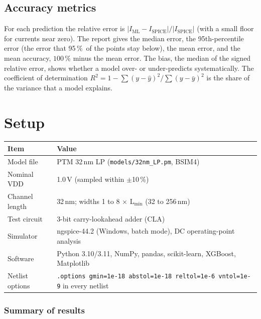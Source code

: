 \documentclass[10pt]{article}
\newcommand{\pct}{\,\%}
\begin{document}
\subsection*{Accuracy metrics}

For each prediction the relative error is $|I_\text{ML} - I_\text{SPICE}| / |I_\text{SPICE}|$
(with a small floor for currents near zero). The report gives the median error, the
95th-percentile error (the error that 95\pct\ of the points stay below), the mean error, and the
mean accuracy, $100\pct$ minus the mean error. The bias, the median of the signed relative error,
shows whether a model over- or under-predicts systematically. The coefficient of determination
$R^2 = 1 - \sum (y - \hat{y})^2 / \sum (y - \bar{y})^2$ is the share of the variance that a model
explains.

\section{Setup}

\begin{table}[H]
\centering
\begin{tabularx}{\textwidth}{@{}p{3.2cm}L@{}}
\toprule
Item & Value \\
\midrule
Model file & PTM 32\,nm LP (\texttt{models/32nm\_LP.pm}, BSIM4) \\
Nominal VDD & 1.0\,V (sampled within $\pm$10\pct) \\
Channel length & 32\,nm; widths 1 to 8 $\times$ L$_{\min}$ (32 to 256\,nm) \\
Test circuit & 3-bit carry-lookahead adder (CLA) \\
Simulator & ngspice-44.2 (Windows, batch mode), DC operating-point analysis \\
Software & Python 3.10/3.11, NumPy, pandas, scikit-learn, XGBoost, Matplotlib \\
Netlist options & \texttt{.options gmin=1e-18 abstol=1e-18 reltol=1e-6 vntol=1e-9} in every netlist \\
\bottomrule
\end{tabularx}
\end{table}

\subsubsection*{Summary of results}
\end{document}
